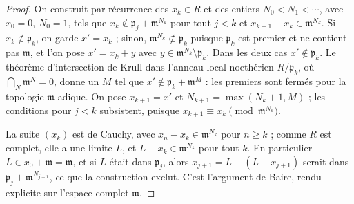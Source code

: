 \begin{proof}
On construit par récurrence des $x_k \in R$ et des entiers $N_0 < N_1 < \cdots$, avec $x_0 = 0$, $N_0 = 1$, tels que $x_k \notin \mathfrak p_j + \mathfrak m^{N_k}$ pour tout $j < k$ et $x_{k+1} - x_k \in \mathfrak m^{N_k}$. Si $x_k \notin \mathfrak p_k$, on garde $x' = x_k$ ; sinon, $\mathfrak m^{N_k} \not\subset \mathfrak p_k$ puisque $\mathfrak p_k$ est premier et ne contient pas $\mathfrak m$, et l'on pose $x' = x_k + y$ avec $y \in \mathfrak m^{N_k} \setminus \mathfrak p_k$. Dans les deux cas $x' \notin \mathfrak p_k$. Le théorème d'intersection de Krull dans l'anneau local noethérien $R/\mathfrak p_k$, où $\bigcap_N \mathfrak m^N = 0$, donne un $M$ tel que $x' \notin \mathfrak p_k + \mathfrak m^M$ : les premiers sont fermés pour la topologie $\mathfrak m$-adique. On pose $x_{k+1} = x'$ et $N_{k+1} = \max(N_k + 1, M)$ ; les conditions pour $j < k$ subsistent, puisque $x_{k+1} \equiv x_k \pmod{\mathfrak m^{N_k}}$.

La suite $(x_k)$ est de Cauchy, avec $x_n - x_k \in \mathfrak m^{N_k}$ pour $n \geq k$ ; comme $R$ est complet, elle a une limite $L$, et $L - x_k \in \mathfrak m^{N_k}$ pour tout $k$. En particulier $L \in x_0 + \mathfrak m = \mathfrak m$, et si $L$ était dans $\mathfrak p_j$, alors $x_{j+1} = L - (L - x_{j+1})$ serait dans $\mathfrak p_j + \mathfrak m^{N_{j+1}}$, ce que la construction exclut. C'est l'argument de Baire, rendu explicite sur l'espace complet $\mathfrak m$.
\end{proof}

